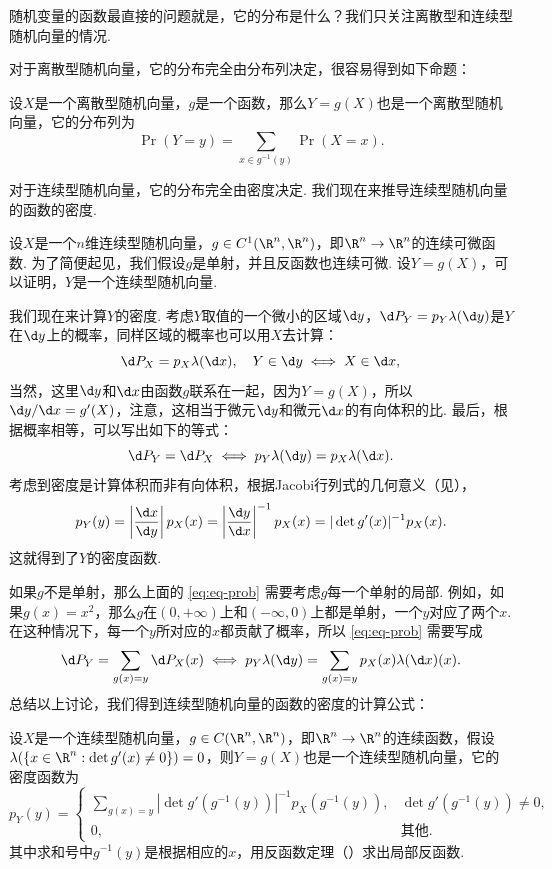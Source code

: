 随机变量的函数最直接的问题就是，它的分布是什么？我们只关注离散型和连续型随机向量的情况.

对于离散型随机向量，它的分布完全由分布列决定，很容易得到如下命题：

\begin{theorem}\label{thm:discrete-function}
设$X$是一个离散型随机向量，$g$是一个函数，那么$Y=g(X)$也是一个离散型随机向量，它的分布列为
\[\Pr(Y=y)=\sum_{x\in g^{-1}(y)}\Pr(X=x).\]
\end{theorem}

对于连续型随机向量，它的分布完全由密度决定. 我们现在来推导连续型随机向量的函数的密度. 

设$X$是一个$n$维连续型随机向量，$g\in C^1(\R^n,\R^n)$，即$\R^n\to\R^n$的连续可微函数. 为了简便起见，我们假设$g$是单射，并且反函数也连续可微. 设$Y=g(X)$，可以证明，$Y$是一个连续型随机向量. 

我们现在来计算$Y$的密度. 考虑$Y$取值的一个微小的区域$\d y$，$\d P_Y=p_Y\lambda(\d y)$是$Y$在$\d y$上的概率，同样区域的概率也可以用$X$去计算：
\[\d P_X=p_X\lambda(\d x),\quad Y\in\d y\iff X\in\d x,\]
当然，这里$\d y$和$\d x$由函数$g$联系在一起，因为$Y=g(X)$，所以$\d y/\d x=g'(X)$，注意，这相当于微元$\d y$和微元$\d x$的有向体积的比. 最后，根据概率相等，可以写出如下的等式：
\begin{equation}
    \d P_Y=\d P_X\iff p_Y\lambda(\d y)=p_X\lambda(\d x).\label{eq:eq-prob}
\end{equation}
考虑到密度是计算体积而非有向体积，根据Jacobi行列式的几何意义（见），
\[p_Y(y)=\left|\frac{\d x}{\d y}\right|p_X(x)=\left|\frac{\d y}{\d x}\right|^{-1}p_X(x)=|\det g'(x)|^{-1}p_X(x).\]
这就得到了$Y$的密度函数. 

如果$g$不是单射，那么上面的 \eqref{eq:eq-prob} 需要考虑$g$每一个单射的局部. 例如，如果$g(x)=x^2$，那么$g$在$(0,+\infty)$上和$(-\infty,0)$上都是单射，一个$y$对应了两个$x$. 在这种情况下，每一个$y$所对应的$x$都贡献了概率，所以 \eqref{eq:eq-prob} 需要写成
\begin{equation}
    \d P_Y=\sum_{g(x)=y}\d P_X(x)\iff p_Y\lambda(\d y)=\sum_{g(x)=y}p_X(x)\lambda(\d x)(x).\label{eq:eq-prob-2}
\end{equation}
总结以上讨论，我们得到连续型随机向量的函数的密度的计算公式：

\begin{theorem}\label{thm:continuous-function}
设$X$是一个连续型随机向量，$g\in C(\R^n,\R^n)$，即$\R^n\to\R^n$的连续函数，假设$\lambda(\{x\in\R^n:\det g'(x)\neq 0\})=0$，则$Y=g(X)$也是一个连续型随机向量，它的密度函数为
\[p_Y(y)=\begin{cases}
    \sum_{g(x)=y}|\det g'(g^{-1}(y))|^{-1}p_X(g^{-1}(y)),&\det g'(g^{-1}(y))\neq 0,\\
    0,&\text{其他}.
\end{cases}\]
其中求和号中$g^{-1}(y)$是根据相应的$x$，用反函数定理（）求出局部反函数. 
\end{theorem}

